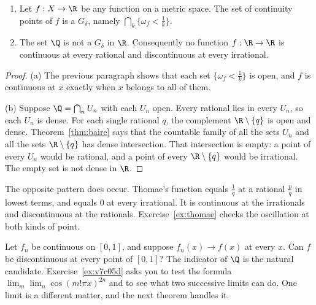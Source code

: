 \begin{proposition}\label{prop:continuitypoints}
\begin{enumerate}[label=(\alph*)]
\item Let $f:X\to\R$ be any function on a metric space. The set of continuity points of $f$ is a $G_\delta$, namely $\bigcap_k\{\omega_f<\frac1k\}$.
\item The set $\Q$ is not a $G_\delta$ in $\R$. Consequently no function $f:\R\to\R$ is continuous at every rational and discontinuous at every irrational.
\end{enumerate}
\end{proposition}
\begin{proof}
(a) The previous paragraph shows that each set $\{\omega_f<\frac1k\}$ is open, and $f$ is continuous at $x$ exactly when $x$ belongs to all of them.

(b) Suppose $\Q=\bigcap_n U_n$ with each $U_n$ open. Every rational lies in every $U_n$, so each $U_n$ is dense. For each single rational $q$, the complement $\R\setminus\{q\}$ is open and dense. Theorem~\ref{thm:baire} says that the countable family of all the sets $U_n$ and all the sets $\R\setminus\{q\}$ has dense intersection. That intersection is empty: a point of every $U_n$ would be rational, and a point of every $\R\setminus\{q\}$ would be irrational. The empty set is not dense in $\R$.
\end{proof}

The opposite pattern does occur. Thomae's function equals $\frac1q$ at a rational $\frac pq$ in lowest terms, and equals $0$ at every irrational. It is continuous at the irrationals and discontinuous at the rationals. Exercise~\ref{ex:thomae} checks the oscillation at both kinds of point.

\begin{think}
Let $f_n$ be continuous on $[0,1]$, and suppose $f_n(x)\to f(x)$ at every $x$. Can $f$ be discontinuous at every point of $[0,1]$? The indicator of $\Q$ is the natural candidate. Exercise~\ref{ex:v7c05d} asks you to test the formula $\lim_m\lim_n\cos(m!\pi x)^{2n}$ and to see what two successive limits can do. One limit is a different matter, and the next theorem handles it.
\end{think}

